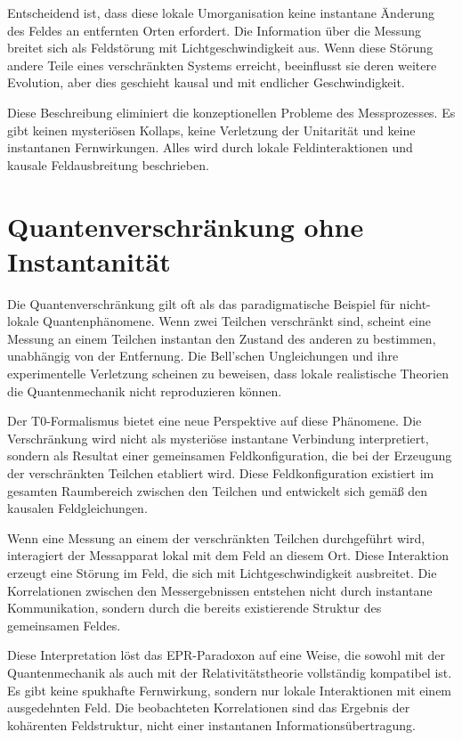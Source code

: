 \documentclass[12pt,a4paper]{article}
\begin{document}
	Entscheidend ist, dass diese lokale Umorganisation keine instantane Änderung des Feldes an entfernten Orten erfordert. Die Information über die Messung breitet sich als Feldstörung mit Lichtgeschwindigkeit aus. Wenn diese Störung andere Teile eines verschränkten Systems erreicht, beeinflusst sie deren weitere Evolution, aber dies geschieht kausal und mit endlicher Geschwindigkeit.
	
	Diese Beschreibung eliminiert die konzeptionellen Probleme des Messprozesses. Es gibt keinen mysteriösen Kollaps, keine Verletzung der Unitarität und keine instantanen Fernwirkungen. Alles wird durch lokale Feldinteraktionen und kausale Feldausbreitung beschrieben.
	
	\section{Quantenverschränkung ohne Instantanität}
	
	Die Quantenverschränkung gilt oft als das paradigmatische Beispiel für nicht-lokale Quantenphänomene. Wenn zwei Teilchen verschränkt sind, scheint eine Messung an einem Teilchen instantan den Zustand des anderen zu bestimmen, unabhängig von der Entfernung. Die Bell'schen Ungleichungen und ihre experimentelle Verletzung scheinen zu beweisen, dass lokale realistische Theorien die Quantenmechanik nicht reproduzieren können.
	
	Der T0-Formalismus bietet eine neue Perspektive auf diese Phänomene. Die Verschränkung wird nicht als mysteriöse instantane Verbindung interpretiert, sondern als Resultat einer gemeinsamen Feldkonfiguration, die bei der Erzeugung der verschränkten Teilchen etabliert wird. Diese Feldkonfiguration existiert im gesamten Raumbereich zwischen den Teilchen und entwickelt sich gemäß den kausalen Feldgleichungen.
	
	Wenn eine Messung an einem der verschränkten Teilchen durchgeführt wird, interagiert der Messapparat lokal mit dem Feld an diesem Ort. Diese Interaktion erzeugt eine Störung im Feld, die sich mit Lichtgeschwindigkeit ausbreitet. Die Korrelationen zwischen den Messergebnissen entstehen nicht durch instantane Kommunikation, sondern durch die bereits existierende Struktur des gemeinsamen Feldes.
	
	Diese Interpretation löst das EPR-Paradoxon auf eine Weise, die sowohl mit der Quantenmechanik als auch mit der Relativitätstheorie vollständig kompatibel ist. Es gibt keine spukhafte Fernwirkung, sondern nur lokale Interaktionen mit einem ausgedehnten Feld. Die beobachteten Korrelationen sind das Ergebnis der kohärenten Feldstruktur, nicht einer instantanen Informationsübertragung.
	
\end{document}

